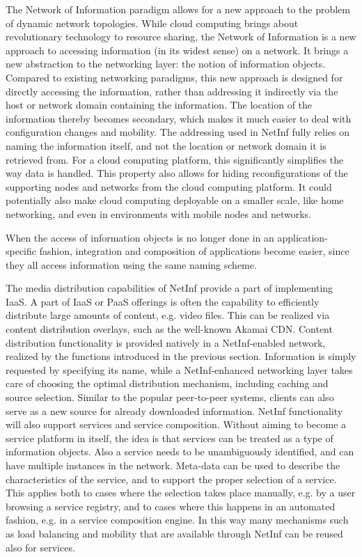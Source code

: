 The Network of Information paradigm allows for a new
approach to the problem of dynamic network topologies.
While cloud computing brings about revolutionary
technology to resource sharing, the Network of Information
is a new approach to accessing information (in its widest
sense) on a network. It brings a new abstraction to the
networking layer: the notion of information objects.
Compared to existing networking paradigms, this new
approach is designed for directly accessing the information,
rather than addressing it indirectly via the host or network
domain containing the information. The location of the
information thereby becomes secondary, which makes it
much easier to deal with configuration changes and mobility.
The addressing used in NetInf fully relies on naming the
information itself, and not the location or network domain it
is retrieved from. For a cloud computing platform, this
significantly simplifies the way data is handled.
This property also allows for hiding reconfigurations of the
supporting nodes and networks from the cloud computing
platform. It could potentially also make cloud computing
deployable on a smaller scale, like home networking, and
even in environments with mobile nodes and networks.

When the access of information objects is no longer done
in an application-specific fashion, integration and
composition of applications become easier, since they all
access information using the same naming scheme. 

The media distribution capabilities of NetInf provide a
part of implementing IaaS. A part of IaaS or PaaS offerings
is often the capability to efficiently distribute large amounts
of content, e.g. video files. This can be realized via content
distribution overlays, such as the well-known Akamai CDN. Content distribution functionality is
provided natively in a NetInf-enabled network, realized by
the functions introduced in the previous section. Information
is simply requested by specifying its name, while a NetInf-enhanced networking layer takes care of choosing the
optimal distribution mechanism, including caching and
source selection. Similar to the popular peer-to-peer systems,
clients can also serve as a new source for already
downloaded information.
NetInf functionality will also support services and service
composition. Without aiming to become a service platform
in itself, the idea is that services can be treated as a type of
information objects. Also a service needs to be
unambiguously identified, and can have multiple instances in
the network. Meta-data can be used to describe the
characteristics of the service, and to support the proper
selection of a service. This applies both to cases where the
selection takes place manually, e.g. by a user browsing a
service registry, and to cases where this happens in an
automated fashion, e.g. in a service composition engine. In
this way many mechanisms such as load balancing and
mobility that are available through NetInf can be reused also
for services.

